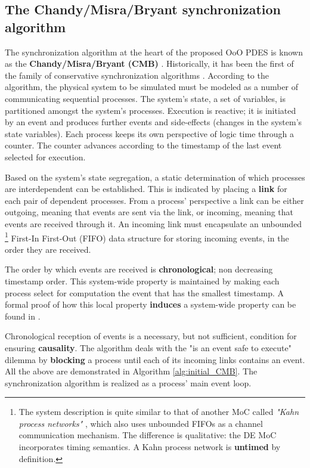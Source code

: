 \documentclass[11pt]{article}
\begin{document}
\subsection{The Chandy/Misra/Bryant synchronization algorithm}
\label{sec:org9d36a74}
The synchronization algorithm at the heart of the proposed OoO PDES is known as the \textbf{Chandy/Misra/Bryant (CMB)} \cite{Bryant} \cite{Chandy1979}.
Historically, it has been the first of the family of conservative synchronization algorithms \cite{Fujimoto1990}.
According to the algorithm, the physical system to be simulated must be modeled as a number of communicating sequential processes.
The system's state, a set of variables, is partitioned amongst the system's processes.
Execution is reactive; it is initiated by an event and produces further events and side-effects (changes in the system's state variables).
Each process keeps its own perspective of logic time through a counter.
The counter advances according to the timestamp of the last event selected for execution.

Based on the system's state segregation, a static determination of which processes are interdependent can be established.
This is indicated by placing a \textbf{link} for each pair of dependent processes.
From a process' perspective a link can be either outgoing, meaning that events are sent via the link, or incoming, meaning that events are received through it.
An incoming link must encapsulate an unbounded \footnote{The system description is quite similar to that of another MoC called \textit{"Kahn process networks"} \cite{Editor2014}, which also uses unbounded FIFOs as a channel communication mechanism.
The difference is qualitative: the DE MoC incorporates timing semantics.
A Kahn process network is \textbf{untimed} by definition.} First-In First-Out (FIFO) data structure  for storing incoming events, in the order they are received.

The order by which events are received is \textbf{chronological}; non decreasing timestamp order.
This system-wide property is maintained by making each process select for computation the event that has the smallest timestamp.
A formal proof of how this local property \textbf{induces} a system-wide property can be found in \cite{Bryant} \cite{Chandy1979}.

Chronological reception of events is a necessary, but not sufficient, condition for ensuring \textbf{causality}.
The algorithm deals with the "is an event safe to execute" dilemma by \textbf{blocking} a process until each of its incoming links contains an event.
All the above are demonstrated in Algorithm \ref{alg:initial_CMB}. 
The synchronization algorithm is realized as a process' main event loop.
\end{document}
